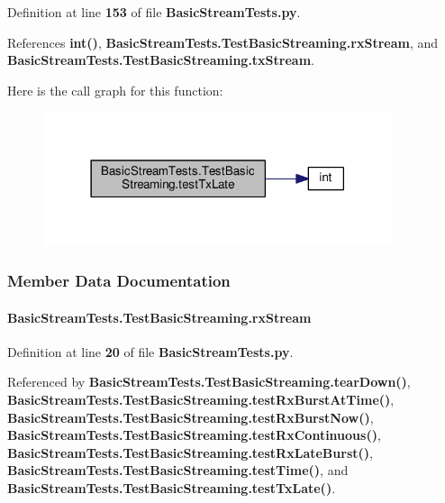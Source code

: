 Definition at line {\bf 153} of file {\bf Basic\+Stream\+Tests.\+py}.



References {\bf int()}, {\bf Basic\+Stream\+Tests.\+Test\+Basic\+Streaming.\+rx\+Stream}, and {\bf Basic\+Stream\+Tests.\+Test\+Basic\+Streaming.\+tx\+Stream}.



Here is the call graph for this function\+:
\nopagebreak
\begin{figure}[H]
\begin{center}
\leavevmode
\includegraphics[width=290pt]{d3/d77/classBasicStreamTests_1_1TestBasicStreaming_a4911b9f77a1331aa691d4f1e5b92b0c8_cgraph}
\end{center}
\end{figure}




\subsubsection{Member Data Documentation}
\paragraph[{rx\+Stream}]{\setlength{\rightskip}{0pt plus 5cm}Basic\+Stream\+Tests.\+Test\+Basic\+Streaming.\+rx\+Stream}\label{classBasicStreamTests_1_1TestBasicStreaming_ac7903ccdccfcb408d5eb5da8ccd227fb}


Definition at line {\bf 20} of file {\bf Basic\+Stream\+Tests.\+py}.



Referenced by {\bf Basic\+Stream\+Tests.\+Test\+Basic\+Streaming.\+tear\+Down()}, {\bf Basic\+Stream\+Tests.\+Test\+Basic\+Streaming.\+test\+Rx\+Burst\+At\+Time()}, {\bf Basic\+Stream\+Tests.\+Test\+Basic\+Streaming.\+test\+Rx\+Burst\+Now()}, {\bf Basic\+Stream\+Tests.\+Test\+Basic\+Streaming.\+test\+Rx\+Continuous()}, {\bf Basic\+Stream\+Tests.\+Test\+Basic\+Streaming.\+test\+Rx\+Late\+Burst()}, {\bf Basic\+Stream\+Tests.\+Test\+Basic\+Streaming.\+test\+Time()}, and {\bf Basic\+Stream\+Tests.\+Test\+Basic\+Streaming.\+test\+Tx\+Late()}.

